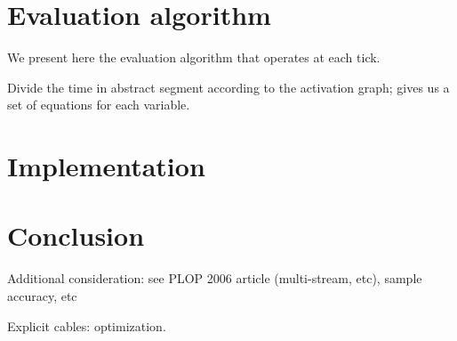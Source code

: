 \documentclass{article}
\begin{document}
	\section{Evaluation algorithm}
    We present here the evaluation algorithm that operates at each tick.
    
    
	Divide the time in abstract segment according to the activation graph; gives us a set of equations for each variable.
	\section{Implementation}
    \section{Conclusion}
    Additional consideration: see PLOP 2006 article (multi-stream, etc), sample accuracy, etc
    
    Explicit cables: optimization.
\end{document}
